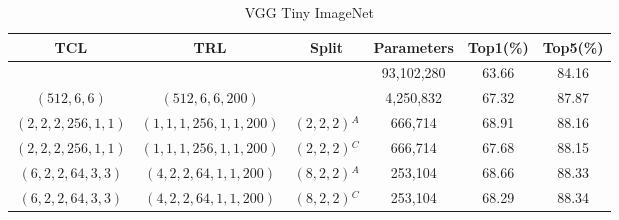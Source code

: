 \documentclass{article}
\begin{document}
	
	
	\begin{table}
		\centering
		\begin{tabular}{c c c c c c}
			\hline
			\textbf{TCL} & \textbf{TRL} & \textbf{Split} & \textbf{Parameters} & \textbf{Top1(\%)} & \textbf{Top5(\%)} \\
			\hline
			& & & 93,102,280 & 63.66 & 84.16 \\
			$(512,6,6)$ & $(512,6,6,200)$ & & 4,250,832 & 67.32 & 87.87 \\
			$(2,2,2,256,1,1)$ & $(1,1,1,256,1,1,200)$ & $(2,2,2)$$^A$ & 666,714 & 68.91 & 88.16 \\
			$(2,2,2,256,1,1)$ & $(1,1,1,256,1,1,200)$ & $(2,2,2)$$^C$ & 666,714 & 67.68 & 88.15 \\
			$(6,2,2,64,3,3)$ & $(4,2,2,64,1,1,200)$ & $(8,2,2)$$^A$ & 253,104 & 68.66 & 88.33 \\
			$(6,2,2,64,3,3)$ & $(4,2,2,64,1,1,200)$ & $(8,2,2)$$^C$ & 253,104 & 68.29 & 88.34 \\
			\hline
		\end{tabular}
		\caption{VGG Tiny ImageNet}
		\label{tab:VGG Tiny Image Net}
	\end{table}
	
\end{document}

